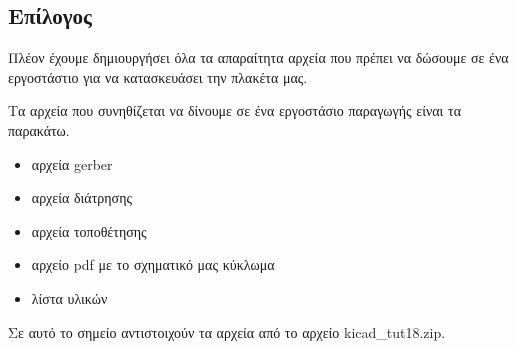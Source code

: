\documentclass[a4paper]{article}
\begin{document}
\subsection{Επίλογος}
Πλέον έχουμε δημιουργήσει όλα τα απαραίτητα αρχεία που πρέπει να δώσουμε σε ένα εργοστάστιο για να κατασκευάσει την πλακέτα μας.

Τα αρχεία που συνηθίζεται να δίνουμε σε ένα εργοστάσιο παραγωγής είναι τα παρακάτω.

\begin{itemize}
    \item αρχεία gerber
    \item αρχεία διάτρησης
    \item αρχεία τοποθέτησης
    \item αρχείο pdf με το σχηματικό μας κύκλωμα
    \item λίστα υλικών
\end{itemize}

Σε αυτό το σημείο αντιστοιχούν τα αρχεία από το αρχείο kicad\_tut18.zip.

  
\end{document}
